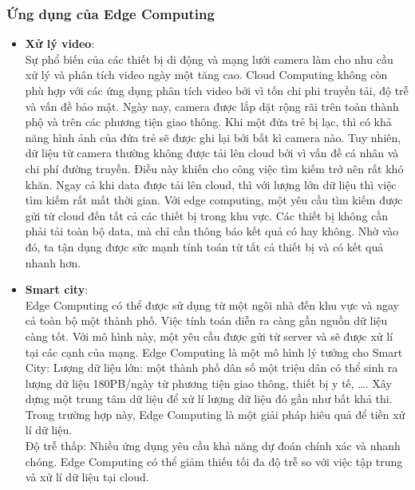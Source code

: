 \documentclass[a4paper]{report}
\begin{document}
\subsubsection{Ứng dụng của Edge Computing}
\begin{itemize}
\item \textbf{Xử lý video}:\\

Sự phổ biến của các thiết bị di động và mạng lưới camera làm cho nhu cầu xử lý và phân tích video ngày một tăng cao. Cloud Computing không còn phù hợp với các ứng dụng phân tích video bởi vì tốn chi phi truyền tải, độ trễ và vấn đề bảo mật. Ngày nay, camera được lắp dặt rộng rãi trên toàn thành phộ và trên các phương tiện giao thông. Khi một đứa trẻ bị lạc, thì có khả năng hình ảnh của đứa trẻ sẽ được ghi lại bởi bất kì camera nào. Tuy nhiên, dữ liệu từ camera thường không được tải lên cloud bởi vì vấn đề cá nhân và chi phí đường truyền. Điều này khiến cho công việc tìm kiếm trở nên rất khó khăn. Ngay cả khi data được tải lên cloud, thì với lượng lớn dữ liệu thì việc tìm kiếm rất mất thời gian. Với edge computing, một yêu cầu tìm kiếm được gửi từ cloud đến tất cả các thiết bị trong khu vực. Các thiết bị không cần phải tải toàn bộ data, mà chỉ cần thông báo kết quả có hay không. Nhờ vào đó, ta tận dụng được sức mạnh tính toán từ tất cả thiết bị và có kết quả nhanh hơn.

\item \textbf{Smart city}:\\

Edge Computing có thể được sử dụng từ một ngôi nhà đến khu vực và ngay cả toàn bộ một thành phố.  Việc tính toán diễn ra càng gần nguồn dữ liệu càng tốt. Với mô hình này, một yêu cầu được gửi từ server và sẽ được xử lí tại các cạnh của mạng. Edge Computing là một mô hình lý tưởng cho Smart City:
Lượng dữ liệu lớn: một thành phố dân số một triệu dân có thể sinh ra lượng dữ liệu 180PB/ngày từ phương tiện giao thông, thiết bị y tế, …. Xây dựng một trung tâm dữ liệu để xử lí lượng dữ liệu đó gần như bất khả thi. Trong trường hợp này, Edge Computing là một giải pháp hiêu quả để tiền xử lí dữ liệu.\\

Độ trễ thấp: Nhiều ứng dụng yêu cầu khả năng dự đoán chính xác và nhanh chóng. Edge Computing có thể giảm thiếu tối đa độ trễ so với việc tập trung và xử lí dữ liệu tại cloud.
\end{itemize}
\end{document}
